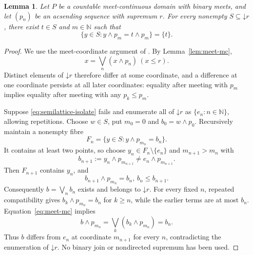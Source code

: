 \documentclass[11pt,reqno]{amsart}
\newtheorem{lemma}[theorem]{Lemma}
\theoremstyle{definition}
\theoremstyle{remark}
\numberwithin{equation}{section}
\newcommand{\N}{\mathbb N}
\newcommand{\down}[1]{\mathord{\downarrow}#1}
\newcommand{\mc}{\wedge}
\begin{document}
\begin{lemma}\label{lem:semilattice-isolation}
Let $P$ be a countable meet-continuous domain with binary meets, and let $(p_n)$ be an acsending sequence with supremum $r$. For every nonempty $S\subseteq\down r$, there exist $t\in S$ and $m\in\N$ such that
\begin{equation}\label{eq:semilattice-isolate}
 \{y\in S:y\mc p_m=t\mc p_m\}=\{t\}.
\end{equation}
\end{lemma}
\begin{proof}
We use the meet-coordinate argument of \cite[Lemma~3.1]{XuJi}. By Lemma~\ref{lem:meet-mc},
\[
 x=\bigvee_n(x\mc p_n)~(x\le r).
\]
Distinct elements of $\down r$ therefore differ at some coordinate, and a difference at one coordinate persists at all later coordinates: equality after meeting with $p_m$ implies equality after meeting with any $p_k\le p_m$.

Suppose \eqref{eq:semilattice-isolate} fails and enumerate all of $\down r$ as $\{e_n:n\in\N\}$, allowing repetitions. Choose $w\in S$, put $m_0=0$ and $b_0=w\mc p_0$. Recursively maintain a nonempty fibre
\[
 F_n=\{y\in S:y\mc p_{m_n}=b_n\}.
\]
It contains at least two points, so choose $y_n\in F_n\setminus\{e_n\}$ and $m_{n+1}>m_n$ with
\[
 b_{n+1}:=y_n\mc p_{m_{n+1}}\ne e_n\mc p_{m_{n+1}}.
\]
Then $F_{n+1}$ contains $y_n$, and
\[
 b_{n+1}\mc p_{m_n}=b_n,~ b_n\le b_{n+1}.
\]
Consequently $b=\bigvee_n b_n$ exists and belongs to $\down r$. For every fixed $n$, repeated compatibility gives $b_k\mc p_{m_n}=b_n$ for $k\ge n$, while the earlier terms are at most $b_n$. Equation~\eqref{eq:meet-mc} implies
\[
 b\mc p_{m_n}=\bigvee_k(b_k\mc p_{m_n})=b_n.
\]
Thus $b$ differs from $e_n$ at coordinate $m_{n+1}$ for every $n$, contradicting the enumeration of $\down r$. No binary join or nondirected supremum has been used.
\end{proof}
\end{document}
